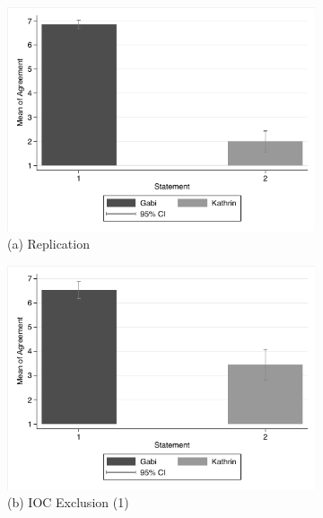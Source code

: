 \documentclass[egregdoesnotlikesansseriftitles,12pt]{scrartcl}
\begin{document}
\begin{landscape}
\begin{figure}[h!]
   \begin{subfigure}[t]{0.28\textwidth}
      \includegraphics[scale=0.7]{figures/cup_rep_bar.pdf}
      \caption{\textsf{\scriptsize(a) Replication}}
      \label{fig:cup_rep_bar}
   \end{subfigure}
   \begin{subfigure}[t]{0.28\textwidth}
      \includegraphics[scale=0.7]{figures/cup_ioc_1_bar.pdf}
      \caption{\textsf{\scriptsize(b) IOC Exclusion (1)}}
      \label{fig:cup_ioc_1_bar}
   \end{subfigure}
   \begin{subfigure}[t]{0.28\textwidth}

\end{subfigure}
\end{figure}
\end{landscape}
\end{document}
